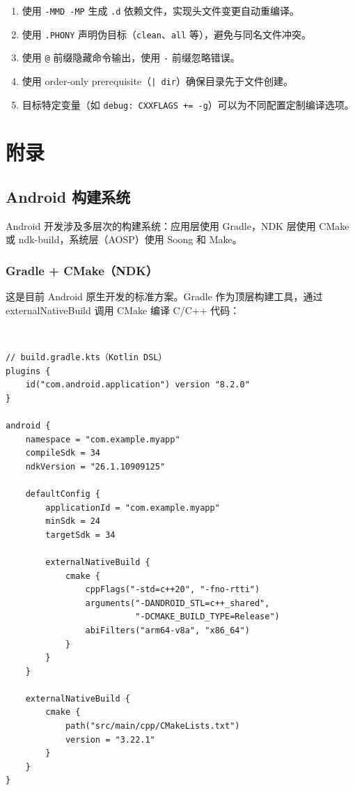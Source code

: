 \documentclass[12pt,a4paper,fontset=fandol]{ctexbook}
\newcommand{\Tp}[1]{\texttt{#1}}
\newcommand{\androidlabel}{%
  \noindent\begin{tcolorbox}[sharp corners,colback=androidheadbg!80!black,colframe=androidheadbg!80!black,
    left=6pt,right=6pt,top=2pt,bottom=2pt,boxrule=0pt]
  \textcolor{white}{\small\bfseries\sffamily Android}\end{tcolorbox}%
}
\begin{document}
\begin{bestpractice}[title=Makefile 最佳实践]
\begin{enumerate}
  \item 使用 \Tp{-MMD -MP} 生成 \Tp{.d} 依赖文件，实现头文件变更自动重编译。
  \item 使用 \Tp{.PHONY} 声明伪目标（\Tp{clean}、\Tp{all} 等），避免与同名文件冲突。
  \item 使用 \Tp{@} 前缀隐藏命令输出，使用 \Tp{-} 前缀忽略错误。
  \item 使用 order-only prerequisite（\Tp{| dir}）确保目录先于文件创建。
  \item 目标特定变量（如 \Tp{debug: CXXFLAGS += -g}）可以为不同配置定制编译选项。
\end{enumerate}
\end{bestpractice}

\part{附录}
\appendix

\chapter{Android 构建系统}

Android 开发涉及多层次的构建系统：应用层使用 Gradle，NDK 层使用 CMake 或 ndk-build，系统层（AOSP）使用 Soong 和 Make。

\section{Gradle + CMake（NDK）}

这是目前 Android 原生开发的标准方案。Gradle 作为顶层构建工具，通过 externalNativeBuild 调用 CMake 编译 C/C++ 代码：

\androidlabel
\begin{lstlisting}[style=bashstyle]
// build.gradle.kts（Kotlin DSL）
plugins {
    id("com.android.application") version "8.2.0"
}

android {
    namespace = "com.example.myapp"
    compileSdk = 34
    ndkVersion = "26.1.10909125"

    defaultConfig {
        applicationId = "com.example.myapp"
        minSdk = 24
        targetSdk = 34

        externalNativeBuild {
            cmake {
                cppFlags("-std=c++20", "-fno-rtti")
                arguments("-DANDROID_STL=c++_shared",
                          "-DCMAKE_BUILD_TYPE=Release")
                abiFilters("arm64-v8a", "x86_64")
            }
        }
    }

    externalNativeBuild {
        cmake {
            path("src/main/cpp/CMakeLists.txt")
            version = "3.22.1"
        }
    }
}
\end{lstlisting}
\end{document}
